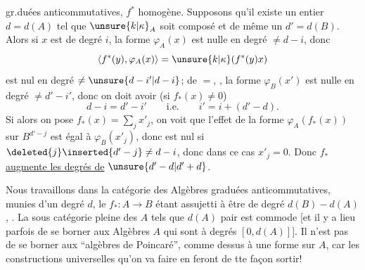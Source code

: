 gr.duées anticommutatives, $f^*$ homogène. Supposons qu'il existe un entier $d=d(A)$ tel que $\unsure{k|\kappa}_A$ soit composé
et de même un $d'=d(B)$. Alors si $x$ est de degré $i$, la forme $\varphi_A(x)$ est nulle en degré $\ne d-i$, donc
\[
\langle f^*(y),\varphi_A(x)\rangle=\unsure{k|\kappa}(f^*(y)x)
\]
est nul en degré $\ne\unsure{d-i'|d-i}$;
 de $=$, , la forme $\varphi_B(x')$ est nulle en degré $\ne d'-i'$, donc on doit avoir (si $f_*(x)\ne0$)
\[
d-i=d'-i'\qquad\text{i.e.}\qquad i'=i+(d'-d).
\]
Si alors on pose $f_*(x)=\sum_jx'_j$, on voit que l'effet de la forme $\varphi_A(f_*(x))$ sur $B^{d'-j}$ est égal à $\varphi_B(x'_j)$, donc est nul si $\deleted{j}\inserted{d'-j}\ne d-i$, donc dans ce cas $x'_j=0$. Donc $f_*$ \uline{augmente les degrés de} $\unsure{d'-d|d'+d}$.

Nous travaillons dans la catégorie  des Algèbres graduées anticommutatives, munies d'un degré $d$, le $f_*:A\longrightarrow B$ étant assujetti à être de degré $d(B)-d(A)$, . La sous catégorie pleine des $A$ tels que $d(A)$ pair est commode [et il y a lieu parfois de se borner aux Algèbres $A$ qui sont à degrés  $[0,d(A)]$]. Il n'est pas  de se borner aux ``algèbres de Poincaré'',  comme dessus à une forme sur $A$, car les constructions universelles qu'on va faire en feront de tte façon sortir!
